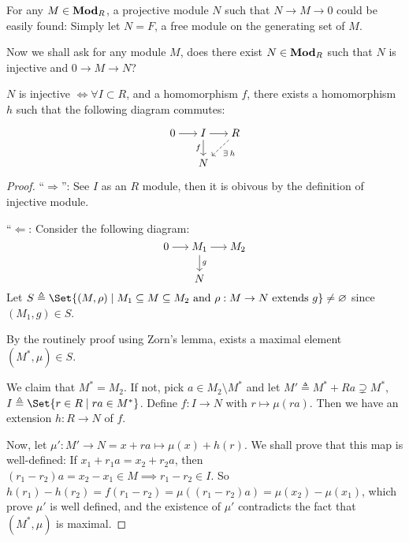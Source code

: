 For any $M \in \mathbf{Mod}_R$, a projective module $N$ such that $N \to M \to 0$ could
be easily found: Simply let $N = F$, a free module on the generating set of $M$.

Now we shall ask for any module $M$, does there exist $N \in \mathbf{Mod}_R$ such that
$N$ is injective and $0 \to M \to N$?

\begin{theorem} \label{thm:boers-criterion}
  $N$ is injective $\iff \forall I \subset R$, and a homomorphism
  $f$, there exists a homomorphism $h$
  such that the following diagram commutes:

  \[ \begin{tikzcd}[cramped, sep=15pt]
    0 \ar[r] & I \ar[d, "f"'] \ar[r] & R \ar[dashed, dl, "\exists h"] \\
     & N
    \end{tikzcd}
  \]
  \begin{proof}
    ``$\Rightarrow$'': See $I$ as an $R$ module, then it is obivous by the
    definition of injective module.

    ``$\Leftarrow$: Consider the following diagram:
    \[
      \begin{tikzcd}[cramped, sep=15pt]
      0 \ar[r] & M_1 \ar[d, "g"] \ar[r] & M_2  \\
        & N
      \end{tikzcd}
    \]
    Let $S \triangleq \Set{ (M, \rho) \mid M_1 \subseteq M \subseteq M_2
      \text{ and } \rho : M \to N \text{ extends } g} \neq \varnothing$
    since $(M_1, g) \in S$.

    By the routinely proof using Zorn's lemma, exists a maximal element $(M^*, \mu) \in S$.

    We claim that $M^* = M_2$.
    If not, pick $a \in M_2 \setminus M^*$
    and let $M' \triangleq M^* + Ra \supsetneq M^*$,
    $I \triangleq \Set{ r \in R \mid ra \in M^* }$.
    Define $f : I \to N$ with $r \mapsto \mu(ra)$.
    Then we have an extension $h : R \to N$ of $f$.

    Now, let $\mu' :  M' \to N = x + ra \mapsto \mu(x) + h(r)$.
    We shall prove that this map is well-defined:
    If $x_1 + r_1a = x_2 + r_2a$, then $(r_1 - r_2) a = x_2 - x_1 \in M \implies
    r_1 - r_2 \in I$.
    So $h(r_1) - h(r_2) = f(r_1 - r_2) = \mu((r_1 - r_2)a) = \mu(x_2) - \mu(x_1)$,
    which prove $\mu'$ is well defined, and the existence of $\mu'$
    contradicts the fact that $(M^*, \mu)$ is maximal.
  \end{proof}
\end{theorem}

